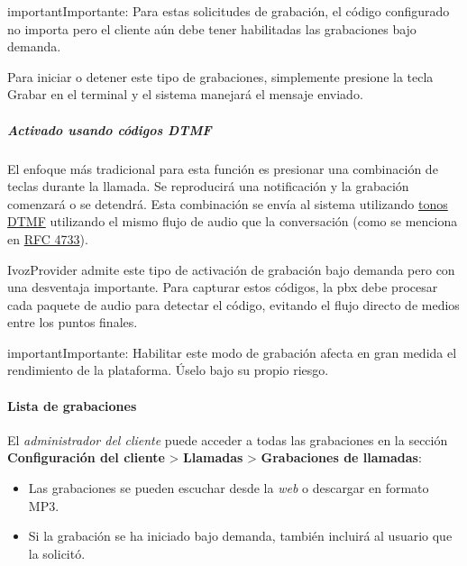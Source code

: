 \documentclass[letterpaper,10pt,spanish]{sphinxmanual}
\begin{document}
\begin{notice}{important}{Importante:}
Para estas solicitudes de grabación, el código configurado no importa pero el cliente aún debe tener habilitadas las grabaciones bajo demanda.
\end{notice}

Para iniciar o detener este tipo de grabaciones, simplemente presione la tecla Grabar en el terminal y el sistema manejará el mensaje enviado.


\subparagraph{Activado usando códigos \emph{DTMF}}
\label{administration_portal/client/vpbx/calls/call_recordings:activated-using-dtmf-codes}
El enfoque más tradicional para esta función es presionar una combinación de teclas durante la llamada. Se reproducirá una notificación y la grabación comenzará o se detendrá. Esta combinación se envía al sistema utilizando \href{https://es.wikipedia.org/wiki/Marcaci\%C3\%B3n\_por\_tonos}{tonos DTMF} utilizando el mismo flujo de audio que la conversación (como se menciona en \href{https://tools.ietf.org/html/rfc4733}{RFC 4733}).

IvozProvider admite este tipo de activación de grabación bajo demanda pero con una desventaja importante. Para capturar estos códigos, la pbx debe procesar cada paquete de audio para detectar el código, evitando el flujo directo de medios entre los puntos finales.

\begin{notice}{important}{Importante:}
Habilitar este modo de grabación afecta en gran medida el rendimiento de la plataforma. Úselo bajo su propio riesgo.
\end{notice}


\paragraph{Lista de grabaciones}
\label{administration_portal/client/vpbx/calls/call_recordings:recordings-list}
El \emph{administrador del cliente} puede acceder a todas las grabaciones en la sección \textbf{Configuración del cliente} \textgreater{} \textbf{Llamadas} \textgreater{} \textbf{Grabaciones de llamadas}:
\begin{itemize}
\item {} 
Las grabaciones se pueden escuchar desde la \emph{web} o descargar en formato MP3.

\item {} 
Si la grabación se ha iniciado bajo demanda, también incluirá al usuario que la solicitó.

\end{itemize}
\end{document}
